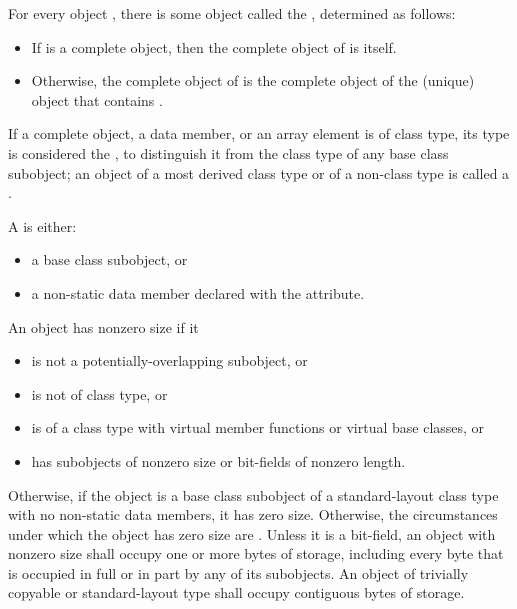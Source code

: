 \pnum
For every object , there is some object called the
 , determined as follows:
\begin{itemize}
\item
If  is a complete object, then the complete object
of  is itself.

\item
Otherwise, the complete object of  is the complete object
of the (unique) object that contains .
\end{itemize}

\pnum
If a complete object, a data member, or an array element is of
class type, its type is considered the , to distinguish it from the class type of any base class subobject;
an object of a most derived class type or of a non-class type is called a
.

\pnum
A  is either:
\begin{itemize}
\item a base class subobject, or
\item a non-static data member
declared with the  attribute.
\end{itemize}

\pnum
{}%
%
An object has nonzero size if it
\begin{itemize}
\item is not a potentially-overlapping subobject, or
\item is not of class type, or
\item is of a class type with virtual member functions or virtual base classes, or
\item has subobjects of nonzero size or bit-fields of nonzero length.
\end{itemize}
Otherwise, if the object is a base class subobject
of a standard-layout class type
with no non-static data members,
it has zero size.
Otherwise, the circumstances under which the object has zero size
are .
%
Unless it is a bit-field,
an object with nonzero size
shall occupy one or more bytes of storage,
including every byte that is occupied in full or in part
by any of its subobjects.
An object of trivially copyable or
standard-layout type shall occupy contiguous bytes of
storage.

